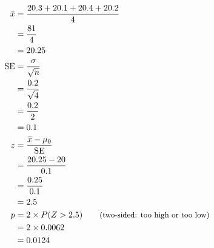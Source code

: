 \begin{align*}
\bar{x} &= \frac{20.3 + 20.1 + 20.4 + 20.2}{4} \\
 &= \frac{81}{4} \\
 &= 20.25 \\
\mathrm{SE} &= \frac{\sigma}{\sqrt{n}} \\
 &= \frac{0.2}{\sqrt{4}} \\
 &= \frac{0.2}{2} \\
 &= 0.1 \\
z &= \frac{\bar{x} - \mu_0}{\mathrm{SE}} \\
 &= \frac{20.25 - 20}{0.1} \\
 &= \frac{0.25}{0.1} \\
 &= 2.5 \\
p &= 2 \times P(Z > 2.5) \qquad \text{\small (two-sided: too high or too low)} \\
 &= 2 \times 0.0062 \\
 &= 0.0124
\end{align*}
